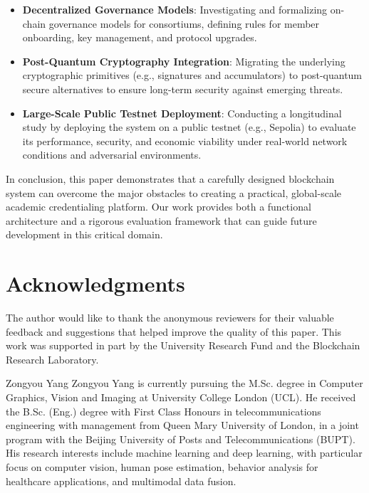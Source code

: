 \documentclass[lettersize,journal]{IEEEtran}
\begin{document}
\begin{itemize}
\begin{itemize}
    \item \textbf{Decentralized Governance Models}: Investigating and formalizing on-chain governance models for consortiums, defining rules for member onboarding, key management, and protocol upgrades.

    \item \textbf{Post-Quantum Cryptography Integration}: Migrating the underlying cryptographic primitives (e.g., signatures and accumulators) to post-quantum secure alternatives to ensure long-term security against emerging threats.
    
    \item \textbf{Large-Scale Public Testnet Deployment}: Conducting a longitudinal study by deploying the system on a public testnet (e.g., Sepolia) to evaluate its performance, security, and economic viability under real-world network conditions and adversarial environments.
\end{itemize}

In conclusion, this paper demonstrates that a carefully designed blockchain system can overcome the major obstacles to creating a practical, global-scale academic credentialing platform. Our work provides both a functional architecture and a rigorous evaluation framework that can guide future development in this critical domain.

\section*{Acknowledgments}
The author would like to thank the anonymous reviewers for their valuable feedback and suggestions that helped improve the quality of this paper. This work was supported in part by the University Research Fund and the Blockchain Research Laboratory.



\begin{IEEEbiographynophoto}{Zongyou Yang}
Zongyou Yang is currently pursuing the M.Sc. degree in Computer Graphics, Vision and Imaging at University College London (UCL). He received the B.Sc. (Eng.) degree with First Class Honours in telecommunications engineering with management from Queen Mary University of London, in a joint program with the Beijing University of Posts and Telecommunications (BUPT). His research interests include machine learning and deep learning, with particular focus on computer vision, human pose estimation, behavior analysis for healthcare applications, and multimodal data fusion.
\end{IEEEbiographynophoto}


\end{itemize}
\end{document}
